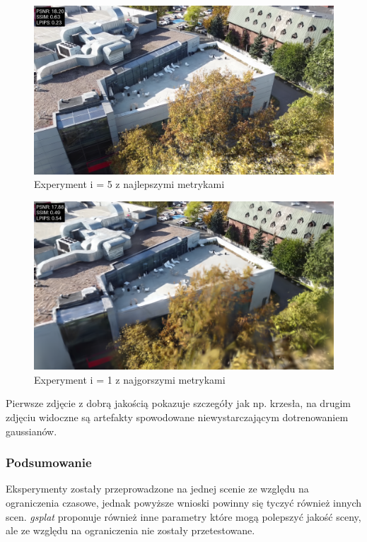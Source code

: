 \begin{figure}[!h]
    \centering
    \includegraphics[width=0.8\linewidth]{img/res_imgs/eval_with_metrics_0010_5.png}
    \caption{Experyment i = 5 z najlepszymi metrykami}\label{fig:eval_1}
\end{figure}

\begin{figure}[!h]
    \centering
    \includegraphics[width=0.8\linewidth]{img/res_imgs/eval_with_metrics_0010_1.png}
    \caption{Experyment i = 1 z najgorszymi metrykami}\label{fig:eval_5}
\end{figure}

Pierwsze zdjęcie z dobrą jakością pokazuje szczegóły jak np. krzesła, na drugim zdjęciu widoczne są artefakty spowodowane niewystarczającym dotrenowaniem gaussianów. 

\subsubsection{Podsumowanie}
Eksperymenty zostały przeprowadzone na jednej scenie ze względu na ograniczenia czasowe, jednak powyższe wnioski powinny się tyczyć również innych scen. \textit{gsplat} proponuje również inne parametry które mogą polepszyć jakość sceny, ale ze względu na ograniczenia nie zostały przetestowane. 